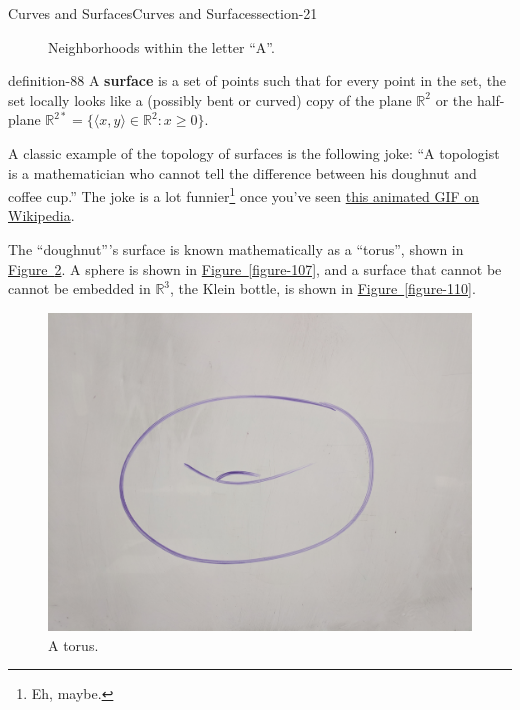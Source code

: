 \documentclass[oneside,10pt,]{article}
\newcommand{\terminology}[1]{\textbf{#1}}
\newcommand{\tuple}[1]{\langle #1 \rangle}
\newcommand{\mb}{\mathbb}
\begin{document}
\begin{sectionptx}{Curves and Surfaces}{}{Curves and Surfaces}{}{}{section-21}
\begin{figure}
\caption{Neighborhoods within the letter ``A''.\label{figure-84}}
\end{figure}
\begin{definition}{}{definition-88}%
\hypertarget{p-89}{}%
A \terminology{surface} is a set of points such that for every point in the set, the set locally looks like a (possibly bent or curved) copy of the plane \(\mathbb R^2\) or the half-plane \(\mathbb R^{2*}=\{\tuple{x,y}\in\mb R^2:x\geq 0\}\).%
\end{definition}
\hypertarget{p-93}{}%
A classic example of the topology of surfaces is the following joke: ``A topologist is a mathematician who cannot tell the difference between his doughnut and coffee cup.'' The joke is a lot funnier\footnote{Eh, maybe.\label{fn-95}} once you've seen \href{https://en.wikipedia.org/wiki/File:Mug_and_Torus_morph.gif}{this animated GIF on Wikipedia}.%
\par
\hypertarget{p-97}{}%
The ``doughnut'''s surface is known mathematically as a ``torus'', shown in \hyperref[figure-104]{Figure~\ref{figure-104}}. A sphere is shown in \hyperref[figure-107]{Figure~\ref{figure-107}}, and a surface that cannot be cannot be embedded in \(\mathbb R^3\), the Klein bottle, is shown in \hyperref[figure-110]{Figure~\ref{figure-110}}.%
\begin{figure}
\centering
\includegraphics[width=1\linewidth]{images/torus.jpg}
\caption{A torus.\label{figure-104}}
\end{figure}
\begin{figure}
\centering

\end{figure}
\end{sectionptx}
\end{document}
